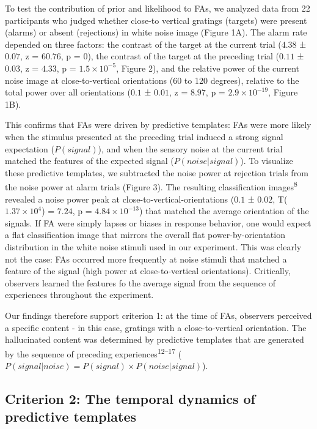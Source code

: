 \documentclass[
]{article}
\begin{document}
To test the contribution of prior and likelihood to FAs, we analyzed
data from 22 participants who judged whether close-to vertical gratings
(targets) were present (alarms) or absent (rejections) in white noise
image (Figure 1A). The alarm rate depended on three factors: the
contrast of the target at the current trial (\(4.38\) ± \(0.07\), z =
\(60.76\), p = \(0\)), the contrast of the target at the preceding trial
(\(0.11\) ± \(0.03\), z = \(4.33\), p =
\(\ensuremath{1.5\times 10^{-5}}\), Figure 2), and the relative power of
the current noise image at close-to-vertical orientations (60 to 120
degrees), relative to the total power over all orientations (\(0.1\) ±
\(0.01\), z = \(8.97\), p = \(\ensuremath{2.9\times 10^{-19}}\), Figure
1B).

This confirms that FAs were driven by predictive templates: FAs were
more likely when the stimulus presented at the preceding trial induced a
strong signal expectation (\(P(signal)\)), and when the sensory noise at
the current trial matched the features of the expected signal
(\(P(noise|signal)\)). To visualize these predictive templates, we
subtracted the noise power at rejection trials from the noise power at
alarm trials (Figure 3). The resulting classification
images\textsuperscript{8} revealed a noise power peak at
close-to-vertical-orientations (\(0.1\) ± \(0.02\),
T(\(\ensuremath{1.37\times 10^{4}}\)) = \(7.24\), p =
\(\ensuremath{4.84\times 10^{-13}}\)) that matched the average
orientation of the signals. If FA were simply lapses or biases in
response behavior, one would expect a flat classification image that
mirrors the overall flat power-by-orientation distribution in the white
noise stimuli used in our experiment. This was clearly not the case: FAs
occurred more frequently at noise stimuli that matched a feature of the
signal (high power at close-to-vertical orientations). Critically,
observers learned the features fo the average signal from the sequence
of experiences throughout the experiment.

Our findings therefore support criterion 1: at the time of FAs,
observers perceived a specific content - in this case, gratings with a
close-to-vertical orientation. The hallucinated content was determined
by predictive templates that are generated by the sequence of preceding
experiences\textsuperscript{12--17}
(\(P(signal|noise) = P(signal) \times P(noise|signal)\)).

\hypertarget{criterion-2-the-temporal-dynamics-of-predictive-templates}{%
\subsection{Criterion 2: The temporal dynamics of predictive
templates}\label{criterion-2-the-temporal-dynamics-of-predictive-templates}}
\end{document}
